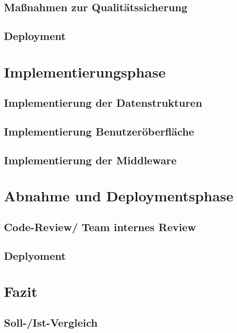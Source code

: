 \documentclass[12pt, ngerman, a4paper,toc=left, parskip=half, numbers=noenddot, headings=standardclasses, nonumberlist]{scrartcl}
\begin{document}
\subsection{Maßnahmen zur Qualitätssicherung}\label{quali}

\subsection{Deployment}

\newpage
\section{Implementierungsphase}

\subsection{Implementierung der Datenstrukturen}

\subsection{Implementierung Benutzeröberfläche}

\subsection{Implementierung der Middleware}
\newpage
\section{Abnahme und Deploymentsphase}

\subsection{Code-Review/ Team internes Review}

\subsection{Deplyoment}

\newpage
\section{Fazit}

\subsection{Soll-/Ist-Vergleich}
\end{document}
